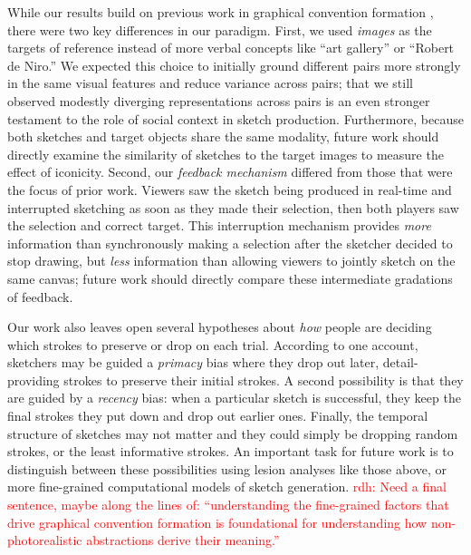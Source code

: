 \documentclass[10pt,letterpaper]{article}
\newcommand{\rdh}[1]{\textcolor{Red}{rdh: #1}}
\begin{document}
While our results build on previous work in graphical convention formation \cite{garrod_foundations_2007,fay2010interactive}, there were two key differences in our paradigm.
First, we used \emph{images} as the targets of reference instead of more verbal concepts like ``art gallery'' or ``Robert de Niro.''
We expected this choice to initially ground different pairs more strongly in the same visual features and reduce variance across pairs; that we still observed modestly diverging representations across pairs is an even stronger testament  to the role of social context in sketch production.
Furthermore, because both sketches and target objects share the same modality, future work should directly examine the similarity of sketches to the target images to measure the effect of iconicity.
Second, our \emph{feedback mechanism} differed from those that were the focus of prior work.
Viewers saw the sketch being produced in real-time and interrupted sketching as soon as they made their selection, then both players saw the selection and correct target.
This interruption mechanism provides \emph{more} information than synchronously making a selection after the sketcher decided to stop drawing, but \emph{less} information than allowing viewers to jointly sketch on the same canvas; future work should directly compare these intermediate gradations of feedback.

Our work also leaves open several hypotheses about \emph{how} people are deciding which strokes to preserve or drop on each trial.
According to one account, sketchers may be guided a \emph{primacy} bias where they drop out later, detail-providing strokes to preserve their initial strokes.
A second possibility is that they are guided by a \emph{recency} bias: when a particular sketch is successful, they keep the final strokes they put down and drop out earlier ones.
Finally, the temporal structure of sketches may not matter and they could simply be dropping random strokes, or the least informative strokes.
An important task for future work is to distinguish between these possibilities using lesion analyses like those above, or more fine-grained computational models of sketch generation.
\rdh{Need a final sentence, maybe along the lines of: ``understanding the fine-grained factors that drive graphical convention formation is foundational for understanding how non-photorealistic abstractions derive their meaning.''}
\end{document}
